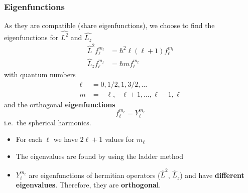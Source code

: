 \subsubsection{Eigenfunctions}

As they are compatible (share eigenfunctions), we choose to find the eigenfunctions for $\widehat{L^2}$ and $\widehat{L_z}$
\begin{align*}
    \widehat{L}^2 f_{\ell}^{m_l} & =\hbar^{2}\ell (\ell+1) f_{\ell}^{m_l} \\
    \widehat{L}_z f_{\ell}^{m_l} & =\hbar mf_{\ell}^{m_l}
\end{align*}
with quantum numbers
\begin{align*}
    \ell & =0, 1/2, 1, 3/2,\ldots                \\
    m    & =-\ell, -\ell+1, \ldots, \ell-1, \ell
\end{align*}
and the orthogonal \textbf{eigenfunctions}
\begin{equation*}
    f_{\ell}^{m_\ell}=Y_{\ell}^{m_\ell}
\end{equation*}
i.e.\ the spherical harmonics.

\newpar{}
\begin{itemize}
    \item For each $\ell$ we have $2\ell+1$ values for $m_\ell$
    \item The eigenvalues are found by using the ladder method
    \item $Y_{\ell}^{m_\ell}$ are eigenfunctions of hermitian operators ($\widehat{L}^2$, $\widehat{L}_{z}$) and have \textbf{different eigenvalues}. Therefore, they are \textbf{orthogonal}.
\end{itemize}


